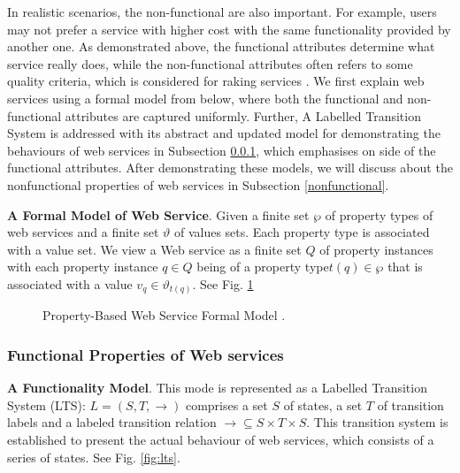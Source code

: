 In realistic scenarios, the non-functional are also important. For example, users may not prefer a service with higher cost with the same functionality provided by another one. As demonstrated above, the functional attributes determine what service really does, while the non-functional attributes often refers to some quality criteria, which is considered for raking services \cite{agarwal2009making}. We first explain web services using a formal model from \cite{agarwal2010d5} below, where both the functional and non-functional attributes are captured uniformly. Further, A Labelled Transition System \cite{agarwal2009making} is addressed with its abstract and updated model for demonstrating the behaviours of web services in Subsection \ref{functional}, which emphasises on side of the functional attributes. After demonstrating these models, we will discuss about the nonfunctional properties of web services in Subsection \ref{nonfunctional}.

\textbf{A Formal Model of Web Service}. Given a finite set $\wp$ of property types of web services and a finite set $\vartheta$ of values sets. Each property type is associated with a value set. We view a Web service as a finite set $Q$ of property instances with each property instance $q \in Q$ being of a property type$t(q) \in \wp$ that is associated with a value $v_q \in \vartheta_{t(q)}$. See Fig. \ref{fig:ws}

\begin{figure}
\centerline{
}
\caption{Property-Based Web Service Formal Model \cite{agarwal2010d5}.}
\label{fig:ws}
\end{figure}

\subsubsection{Functional Properties of Web services}\label{functional}

\textbf{A Functionality Model}. This mode is represented as a Labelled Transition System (LTS): $L = (S,T,\rightarrow)$ comprises a set $S$ of states, a set $T$ of transition labels and a labeled transition relation $\rightarrow \subseteq S \times T \times S$. This transition system is established to present the actual behaviour of web services, which consists of a series of states. See Fig. \ref{fig:lts}.

